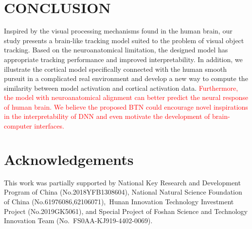 \documentclass[final,3p,times,twocolumn]{elsarticle}
\begin{document}
\section{CONCLUSION}
Inspired by the visual processing mechanisms found in the human brain, our study presents a brain-like tracking model suited to the problem of visual object tracking. 
Based on the neuroanatomical limitation, the designed model has appropriate tracking performance and improved interpretability. 
In addition, we illustrate the cortical model specifically connected with the human smooth pursuit in a complicated real environment 
and develop a new way to compute the similarity between model activation and cortical activation data. 
\textcolor{red}{
Furthermore, the model with neuroanatomical alignment can better predict the neural response of human brain. 
We believe the proposed BTN could encourage novel inspirations in the interpretability of DNN 
and even motivate the development of brain-computer interfaces.}


\section*{Acknowledgements}This work was partially supported by National Key Research and Development Program of China (No.2018YFB1308604), National Natural Science Foundation of China (No.61976086,62106071), Hunan Innovation Technology Investment Project (No.2019GK5061), and Special Project of Foshan Science and Technology Innovation Team (No. FS0AA-KJ919-4402-0069).
\label{}





 

%
%
%
%
\end{document}
